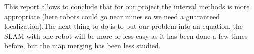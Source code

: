 This report allows to conclude that for our project the interval methods is more appropriate (here robots could go near mines so we need a guaranteed localization).The next thing to do is to put our problem into an equation, the SLAM with one robot will be more or less easy as it has been done a few times before, but the map merging has been less studied.